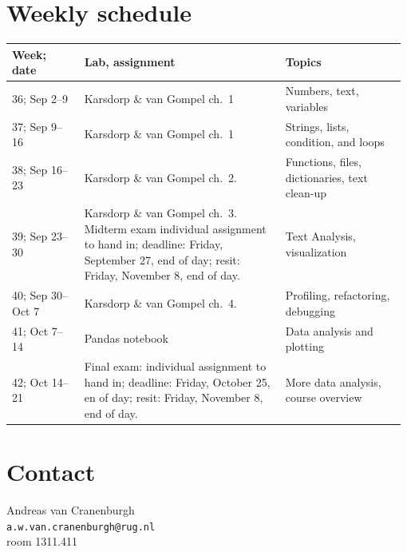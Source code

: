 \documentclass[a4paper,12pt]{article}
\begin{document}
\section{Weekly schedule}\label{sectimetable}
{\raggedright
\begin{longtable}{p{0.18\linewidth} p{0.5\linewidth} p{0.3\linewidth} }
Week; date          & Lab, assignment & Topics \\ \midrule

36; Sep 2--9 &
    Karsdorp \& van Gompel ch.\ 1
    & Numbers, text, variables
    \\

37; Sep 9--16     &
    Karsdorp \& van Gompel ch.\ 1
    & Strings, lists, condition, and loops
    \\

38; Sep 16--23    &
    Karsdorp \& van Gompel ch.\ 2.
    & Functions, files, dictionaries, text clean-up
    \\

39; Sep 23--30    &
    Karsdorp \& van Gompel ch.\ 3.
    Midterm exam individual assignment to hand in;
    deadline: Friday, September 27, end
    of day; resit: Friday, November 8, end
    of day.
    & Text Analysis, visualization
    \\

40; Sep 30--Oct 7 &
    Karsdorp \& van Gompel ch.\ 4.
    & Profiling, refactoring, debugging 
    \\

41; Oct 7--14     &
    Pandas notebook
    & Data analysis and plotting
    \\

42; Oct 14--21    &
    Final exam: individual
    assignment to hand in; deadline:
    Friday, October 25, en of day; resit:
    Friday, November 8, end of day.
    & More data analysis, course overview
    \\

\end{longtable}
}

\section{Contact}

Andreas van Cranenburgh\\
\texttt{a.w.van.cranenburgh@rug.nl} \\
room 1311.411
\end{document}
